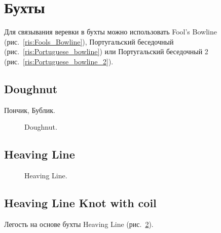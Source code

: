\section{Бухты}

Для связывания веревки в бухты можно использовать Fool's Bowline (рис.~\ref{ris:Fools_Bowline}), Португальский беседочный (рис.~\ref{ris:Portuguese_bowline}) или Португальский беседочный 2 (рис.~\ref{ris:Portuguese_bowline_2}).

\subsection{Doughnut}

Пончик, Бублик.

\begin{figure}[H]\centering
	\begin{minipage}{1\linewidth}
		\begin{center}
			\tcbox[enhanced jigsaw,colframe=black,opacityframe=0.5,opacityback=0.5]
			{\centering{}}
		\end{center}
	\end{minipage}
\caption{Doughnut.}
\label{ris:Doughnut}
\end{figure}

\subsection{Heaving Line}

\begin{figure}[H]\centering
	\subfloat[Завязывание)]{\label{ris:Heaving_Line_1}
	\tcbox[enhanced jigsaw,colframe=black,opacityframe=0.5,opacityback=0.5]
		{\centering
			}
		}
\end{figure}

\begin{figure}[H]\centering
	\subfloat[Результат]{\label{ris:Heaving_Line_2}
	\tcbox[enhanced jigsaw,colframe=black,opacityframe=0.5,opacityback=0.5]
		{\centering
			}
		}
	\caption{Heaving Line.}\label{ris:Heaving_Line}
\end{figure}

\subsection{Heaving Line Knot with coil}

Легость на основе бухты Heaving Line (рис.~\ref{ris:Heaving_Line}).

